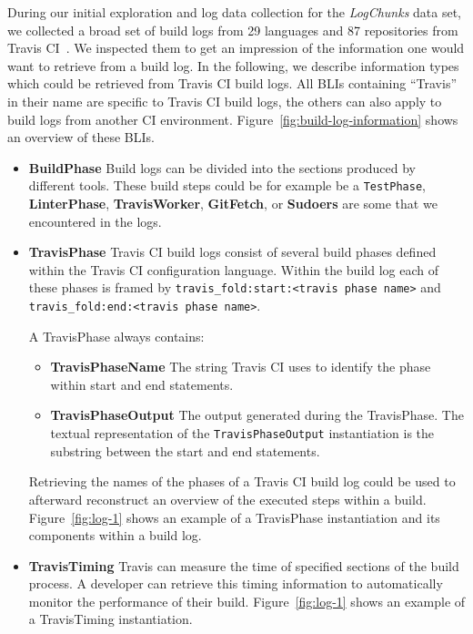 \documentclass[\myrootdir/main.tex]{subfiles}
\begin{document}
During our initial exploration and log data collection for the \emph{LogChunks} data set, we collected a broad set of build logs from 29 languages and 87 repositories from Travis CI~\cite{travisci2019webpage}.
We inspected them to get an impression of the information one would want to retrieve from a build log.
In the following, we describe information types which could be retrieved from Travis CI build logs.
All BLIs containing ``Travis'' in their name are specific to Travis CI build logs, the others can also apply to build logs from another CI environment.
Figure~\ref{fig:build-log-information} shows an overview of these BLIs.

\begin{itemize}
	\item \textbf{BuildPhase} Build logs can be divided into the sections produced by different tools.
	      These build steps could be for example be a \texttt{TestPhase}, \textbf{LinterPhase}, \textbf{TravisWorker}, \textbf{GitFetch}, or \textbf{Sudoers} are some that we encountered in the logs.

	\item \textbf{TravisPhase} Travis CI build logs consist of several build phases defined within the Travis CI configuration language. Within the build log each of these phases is framed by \lstinline{travis_fold:start:<travis phase name>} and \\ \lstinline{travis_fold:end:<travis phase name>}.

	      A TravisPhase always contains:
	      \begin{itemize}
		      \item \textbf{TravisPhaseName} The string Travis CI uses to identify the phase within start and end statements.
		      \item \textbf{TravisPhaseOutput} The output generated during the TravisPhase. The textual representation of the \texttt{TravisPhaseOutput} instantiation is the substring between the start and end statements.
	      \end{itemize}
				 Retrieving the names of the phases of a Travis CI build log could be used to afterward reconstruct an overview of the executed steps within a build.
	       Figure~\ref{fig:log-1} shows an example of a TravisPhase instantiation and its components within a build log.

	\item \textbf{TravisTiming} Travis can measure the time of specified sections of the build process.
				A developer can retrieve this timing information to automatically monitor the performance of their build.
	      Figure~\ref{fig:log-1} shows an example of a TravisTiming instantiation.


\end{itemize}
\end{document}
